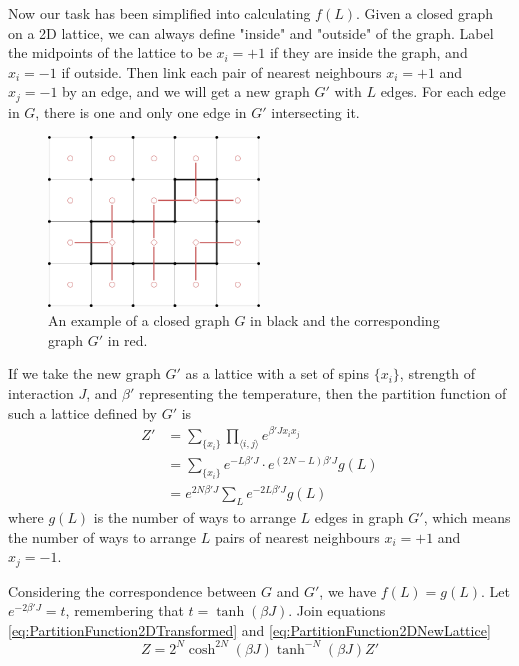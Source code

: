 \documentclass[11pt]{article}
\begin{document}
	Now our task has been simplified into calculating $f(L)$. Given a closed graph on a 2D lattice, we can always define "inside" and "outside" of the graph. Label the midpoints of the lattice to be $x_i=+1$ if they are inside the graph, and $x_i=-1$ if outside. Then link each pair of nearest neighbours $x_i=+1$ and $x_j=-1$ by an edge, and we will get a new graph $G'$ with $L$ edges. For each edge in $G$, there is one and only one edge in $G'$ intersecting it.

	\begin{figure}[H]
		\begin{center}
			\includegraphics[width=0.5\textwidth]{./img/ising-graph.png}
		\end{center}
		\caption{An example of a closed graph $G$ in black and the corresponding graph $G'$ in red.}
		\label{fig:ising_graph}
	\end{figure}

	If we take the new graph $G'$ as a lattice with a set of spins $\{x_i\}$, strength of interaction $J$, and $\beta'$ representing the temperature, then the partition function of such a lattice defined by $G'$ is
	\begin{equation} \label{eq:PartitionFunction2DNewLattice}
		\begin{aligned}
			Z' &= \sum_{\{x_i\}} \prod_{\langle i,j \rangle} e^{\beta' J x_i x_j} \\
			&= \sum_{\{x_i\}} e^{-L\beta' J} \cdot e^{(2N-L)\beta' J} g(L) \\
			&= e^{2N\beta' J} \sum_{L} e^{-2L\beta' J} g(L)
		\end{aligned}
	\end{equation}
	where $g(L)$ is the number of ways to arrange $L$ edges in graph $G'$, which means the number of ways to arrange $L$ pairs of nearest neighbours $x_i=+1$ and $x_j=-1$.
	
	Considering the correspondence between $G$ and $G'$, we have $f(L) = g(L)$. Let $e^{-2\beta' J} = t$, remembering that $t = \tanh(\beta J)$. Join equations \eqref{eq:PartitionFunction2DTransformed} and \eqref{eq:PartitionFunction2DNewLattice}
	\begin{equation} \label{eq:PartitionFunction2DComparison}
		Z = 2^N \cosh^{2N}(\beta J) \tanh^{-N}(\beta J) Z'
	\end{equation}
\end{document}
